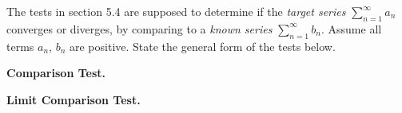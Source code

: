 The tests in section 5.4 are supposed to determine if the \emph{target series} $\sum_{n=1}^\infty a_n$ converges or diverges, by comparing to a \emph{known series} $\sum_{n=1}^\infty b_n$.  Assume all terms $a_n$, $b_n$ are positive.  State the general form of the tests below.

\medskip \noindent \textbf{Comparison Test.}

\vspace{35mm}

\medskip \noindent \textbf{Limit Comparison Test.}

\vspace{20mm}
